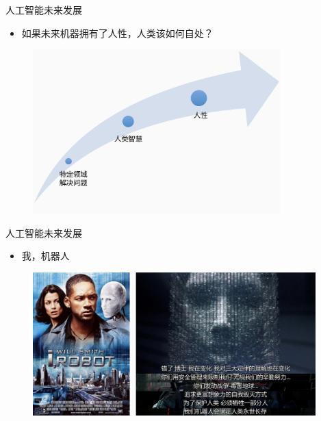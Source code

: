 \documentclass{beamer}
\begin{document}
  \begin{frame}{人工智能未来发展}
    \begin{itemize}
     \item  如果未来机器拥有了人性，人类该如何自处？
    \end{itemize}
   \begin{figure}[H]
   \centering
   \includegraphics[height=2.5in]{cdjPic1.jpg}
   \end{figure}
  \end{frame}
  


   \begin{frame}{人工智能未来发展}
    \begin{itemize}
     \item 我，机器人
    \end{itemize}
   \begin{figure}[H]
   \centering
   \includegraphics[width=4.3in]{cdjPic3.jpg}
   \end{figure}
  \end{frame}
  
\end{document}

